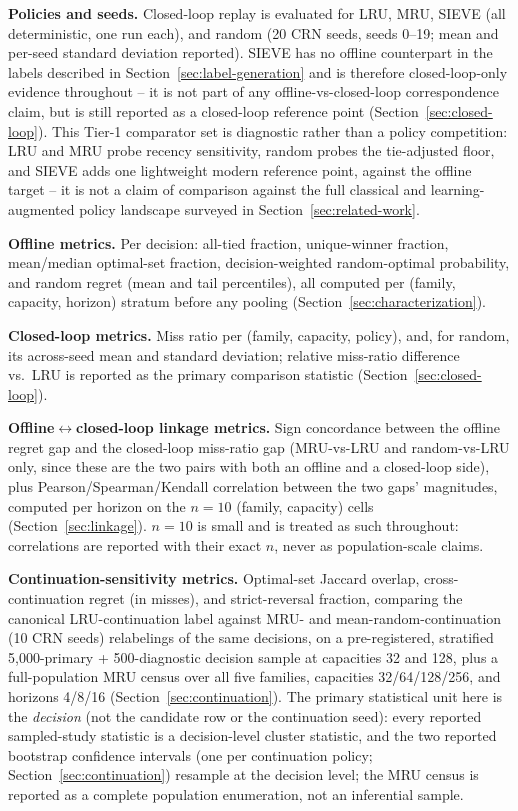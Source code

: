 \textbf{Policies and seeds.} Closed-loop replay is evaluated for LRU, MRU,
SIEVE (all deterministic, one run each), and random (20 CRN seeds, seeds
0--19; mean and per-seed standard deviation reported). SIEVE has no
offline counterpart in the labels described in Section~\ref{sec:label-generation}
and is therefore closed-loop-only evidence throughout -- it is not part of
any offline-vs-closed-loop correspondence claim, but is still reported as
a closed-loop reference point (Section~\ref{sec:closed-loop}). This Tier-1
comparator set is diagnostic rather than a policy competition: LRU and MRU
probe recency sensitivity, random probes the tie-adjusted floor, and SIEVE
adds one lightweight modern reference point, against the offline target --
it is not a claim of comparison against the full classical and
learning-augmented policy landscape surveyed in Section~\ref{sec:related-work}.

\textbf{Offline metrics.} Per decision: all-tied fraction, unique-winner
fraction, mean/median optimal-set fraction, decision-weighted random-optimal
probability, and random regret (mean and tail percentiles), all computed
per (family, capacity, horizon) stratum before any pooling
(Section~\ref{sec:characterization}).

\textbf{Closed-loop metrics.} Miss ratio per (family, capacity, policy),
and, for random, its across-seed mean and standard deviation; relative
miss-ratio difference vs.\ LRU is reported as the primary comparison
statistic (Section~\ref{sec:closed-loop}).

\textbf{Offline$\leftrightarrow$closed-loop linkage metrics.} Sign
concordance between the offline regret gap and the closed-loop miss-ratio
gap (MRU-vs-LRU and random-vs-LRU only, since these are the two pairs with
both an offline and a closed-loop side), plus Pearson/Spearman/Kendall
correlation between the two gaps' magnitudes, computed per horizon on the
$n=10$ (family, capacity) cells (Section~\ref{sec:linkage}). $n=10$ is
small and is treated as such throughout: correlations are reported with
their exact $n$, never as population-scale claims.

\textbf{Continuation-sensitivity metrics.} Optimal-set Jaccard overlap,
cross-continuation regret (in misses), and strict-reversal fraction,
comparing the canonical LRU-continuation label against MRU- and
mean-random-continuation (10 CRN seeds) relabelings of the same decisions,
on a pre-registered, stratified 5,000-primary + 500-diagnostic decision
sample at capacities 32 and 128, plus a full-population MRU census over
all five families, capacities 32/64/128/256, and horizons 4/8/16
(Section~\ref{sec:continuation}). The primary statistical unit here is
the \emph{decision} (not the candidate row or the continuation seed):
every reported sampled-study statistic is a decision-level cluster
statistic, and the two reported bootstrap confidence intervals (one per
continuation policy; Section~\ref{sec:continuation}) resample at the
decision level; the MRU census is reported as a complete population
enumeration, not an inferential sample.

